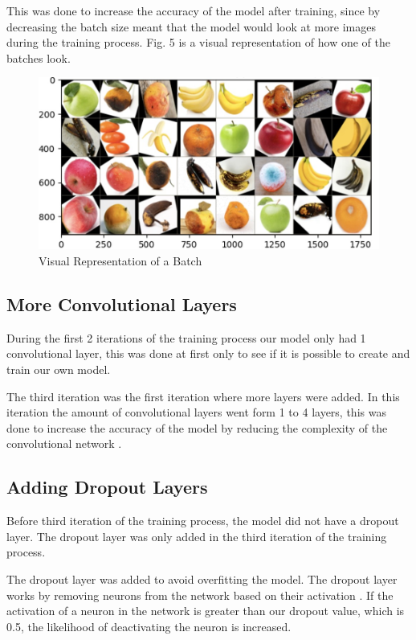 \documentclass[conference]{IEEEtran}
\begin{document}
This was done to increase the accuracy of the model after training, since by decreasing the batch size meant that the model would look at more images during the training process. Fig. 5 is a visual representation of how one of the batches look.

\begin{figure}[h]
    \centering
    \includegraphics[width=\linewidth]{Batch_Representation.jpg}
    \caption{Visual Representation of a Batch}
    \label{fig}
\end{figure}

\subsection{More Convolutional Layers}

During the first 2 iterations of the training process our model only had 1 convolutional layer, this was done at first only to see if it is possible to create and train our own model. 

The third iteration was the first iteration where more layers were added. In this iteration the amount of convolutional layers went form 1 to 4 layers, this was done to increase the accuracy of the model by reducing the complexity of the convolutional network \cite{b3}.

\subsection{Adding Dropout Layers}

Before third iteration of the training process, the model did not have a dropout layer. The dropout layer was only added in the third iteration of the training process.

The dropout layer was added to avoid overfitting the model. The dropout layer works by removing neurons from the network based on their activation \cite{b5}. If the activation of a neuron in the network is greater than our dropout value, which is 0.5, the likelihood of deactivating the neuron is increased.
\end{document}

